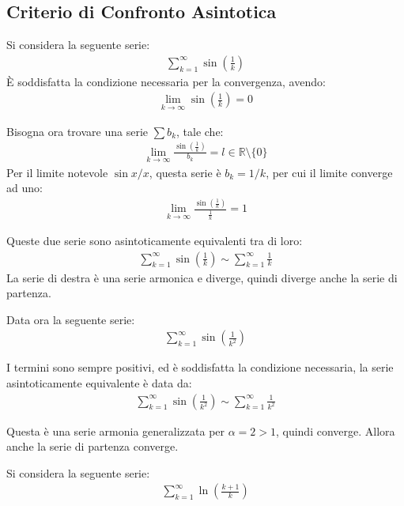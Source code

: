 \documentclass{article}
\numberwithin{equation}{subsection}
\begin{document}
\subsection{Criterio di Confronto Asintotica}


Si considera la seguente serie:
\begin{gather*}
    \displaystyle\sum_{k=1}^\infty\sin\left(\frac{1}{k}\right)
\end{gather*}
È soddisfatta la condizione necessaria per la convergenza, avendo:
\begin{gather*}
    \displaystyle\lim_{k\to\infty}\sin\left(\frac{1}{k}\right)=0
\end{gather*}

Bisogna ora trovare una serie $\sum b_k$, tale che:
\begin{gather*}
    \displaystyle\lim_{k\to\infty}\frac{\sin\left(\frac{1}{k}\right)}{b_k}=l\in\mathbb{R}\setminus\{0\}
\end{gather*}
Per il limite notevole $\sin x/x$, questa serie è $b_k=1/k$, per cui il limite converge ad uno:
\begin{gather*}
    \displaystyle\lim_{k\to\infty}\frac{\sin\left(\frac{1}{k}\right)}{\frac{1}{k}}=1
\end{gather*}

Queste due serie sono asintoticamente equivalenti tra di loro:
\begin{gather*}
    \displaystyle\sum_{k=1}^\infty\sin\left(\frac{1}{k}\right)\sim\sum_{k=1}^\infty\frac{1}{k}
\end{gather*}
La serie di destra è una serie armonica e diverge, quindi diverge anche la serie di partenza. 

Data ora la seguente serie:
\begin{gather*}
    \displaystyle\sum_{k=1}^\infty\sin\left(\frac{1}{k^2}\right)
\end{gather*}

I termini sono sempre positivi, ed è soddisfatta la condizione necessaria, la serie asintoticamente equivalente è data da:
\begin{gather*}
    \displaystyle\sum_{k=1}^\infty\sin\left(\frac{1}{k^2}\right)\sim\displaystyle\sum_{k=1}^\infty\frac{1}{k^2}
\end{gather*}

Questa è una serie armonia generalizzata per $\alpha=2>1$, quindi converge. Allora anche la serie di partenza converge.  


Si considera la seguente serie:
\begin{gather*}
    \displaystyle\sum_{k=1}^\infty\ln\left(\frac{k+1}{k}\right)
\end{gather*}
\end{document}
